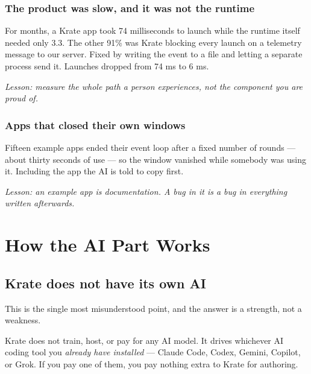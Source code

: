 \documentclass[11pt,a4paper]{report}
\begin{document}
\subsection{The product was slow, and it was not the runtime}

For months, a Krate app took 74 milliseconds to launch while the runtime
itself needed only 3.3. The other 91\% was Krate blocking every launch on
a telemetry message to our server. Fixed by writing the event to a file
and letting a separate process send it. Launches dropped from 74 ms to
6 ms.

\emph{Lesson: measure the whole path a person experiences, not the
component you are proud of.}

\subsection{Apps that closed their own windows}

Fifteen example apps ended their event loop after a fixed number of
rounds --- about thirty seconds of use --- so the window vanished while
somebody was using it. Including the app the AI is told to copy first.

\emph{Lesson: an example app is documentation. A bug in it is a bug in
everything written afterwards.}

\chapter{How the AI Part Works}

\section{Krate does not have its own AI}

This is the single most misunderstood point, and the answer is a strength,
not a weakness.

Krate does not train, host, or pay for any AI model. It drives whichever
AI coding tool you \emph{already have installed} --- Claude Code, Codex,
Gemini, Copilot, or Grok. If you pay one of them, you pay nothing extra to
Krate for authoring.
\end{document}
